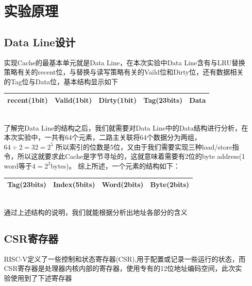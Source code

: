 
\section{实验原理}
\subsection{Data Line设计}
实现Cache的最基本单元就是Data Line，在本次实验中Data Line含有与LRU替换策略有关的recent位，与替换与读写策略有关的Vaild位和Dirty位，还有数据相关的Tag位与Data位，基本结构显示如下\\

\begin{tabular}{|c|c|c|c|c|}
    \hline
    recent(1bit) & Valid(1bit) & Dirty(1bit) & Tag(23bits) & Data \\
    \hline
\end{tabular} \\

了解完Data Line的结构之后，我们就需要对Data Line中的Data结构进行分析，在本次实验中，一共有64个元素，二路主关联将64个数据分为两组，$64 \div 2 = 32 = 2^5$
所以索引的位数是5位，又由于我们需要实现三种load/store指令，所以这就要求此Cache是字节寻址的，这就意味着需要有2位的byte address(1 word等于$4 = 2 ^ 2$bytes)。 
综上所述，一个元素的结构如下：

\begin{tabular}{|c|c|c|c|}
    \hline
    Tag(23bits) & Index(5bits) & Word(2bits) & Byte(2bits) \\
    \hline
\end{tabular} \\

通过上述结构的说明，我们就能根据分析出地址各部分的含义 \\

\subsection{CSR寄存器}
RISC-V定义了一些控制和状态寄存器(CSR),用于配置或记录一些运行的状态，而CSR寄存器是处理器内核内部的寄存器，使用专有的12位地址编码空间，此次实验使用到了下述寄存器

